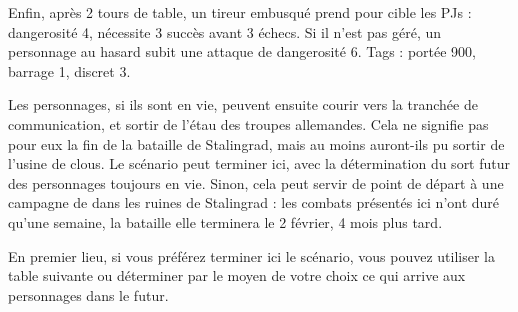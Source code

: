 \documentclass{report}
\begin{document}
\begin{multicols}{2}
Enfin, après 2 tours de table, un tireur embusqué prend pour cible les PJs : dangerosité 4, nécessite 3 succès avant 3 échecs. Si il n'est pas géré, un personnage au hasard subit une attaque de dangerosité 6. Tags : portée 900, barrage 1, discret 3.

Les personnages, si ils sont en vie, peuvent ensuite courir vers la tranchée de communication, et sortir de l'étau des troupes allemandes. Cela ne signifie pas pour eux la fin de la bataille de Stalingrad, mais au moins auront-ils pu sortir de l'usine de clous.
Le scénario peut terminer ici, avec la détermination du sort futur des personnages toujours en vie. Sinon, cela peut servir de point de départ à une campagne de \nomjeu dans les ruines de Stalingrad : les combats présentés ici n'ont duré qu'une semaine, la bataille elle terminera le 2 février, 4 mois plus tard. 

En premier lieu, si vous préférez terminer ici le scénario, vous pouvez utiliser la table suivante ou déterminer par le moyen de votre choix ce qui arrive aux personnages dans le futur. 


\end{multicols}
\end{document}
